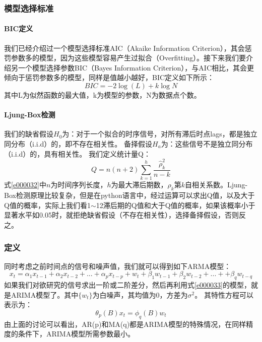 \subsubsection{模型选择标准}
\paragraph{BIC定义}
我们已经介绍过一个模型选择标准AIC（Akaike Information Criterion），其会惩罚参数多的模型，因为这些模型容易产生过拟合（Overfitting）。接下来我们要介绍另一个模型选择参数BIC（Bayes Information Criterion），与AIC相比，其会更倾向于惩罚参数多的模型，同样是值越小越好，BIC定义如下所示：
\begin{equation}
BIC=-2\log (L) + k \log N
\label{e000031}
\end{equation}
其中L为似然函数的最大值，k为模型的参数，N为数据点个数。
\paragraph{Ljung-Box检测}
我们的缺省假设$H_{0}$为：对于一个拟合的时序信号，对所有滞后时点lags，都是独立同分布（i.i.d）的，即不存在相关性。\newline
备择假设$H_{a}$为：这些信号不是独立同分布（i.i.d）的，具有相关性。\newline
我们定义统计量Q：
\begin{equation}
Q=n(n+2)\sum_{k=1}^{h} \frac{\hat{\rho}_{k}^{2}}{n-k}
\label{e000032}
\end{equation}
式\ref{e000032}中$n$为时间序列长度，$h$为最大滞后期数，$\rho _{k}$第$k$自相关系数。Ljung-Box检测原理比较复杂，但是在python语言中，经过运算可以求出Q值，以及大于Q值的概率，实际上我们看1$\sim$12滞后期的Q值和大于Q值的概率，如果该概率小于显著水平如0.05时，就拒绝缺省假设（不存在相关性），选择备择假设，否则反之。
\subsubsection{定义}
同时考虑之前时间点的信号和噪声值，我们就可以得到如下ARMA模型：
\begin{equation}
x_{t}=\alpha _{1}x_{t-1} + \alpha _{2}x_{t-2} + ... + \alpha _{p}x_{t-p} + w_{t} + \beta _1w_{t-1} + \beta _2w_{t-2}+...+ + \beta _{q}w_{t-q}
\label{e000033}
\end{equation}
如果我们对欲研究的信号求出一阶或二阶差分，然后再利用式\ref{e000033}的模型，就是ARIMA模型了。其中$\{ w_{t} \}$为白噪声，其均值为0，方差为$\sigma ^{2}$。\newline
其特性方程可以表示为：
\begin{equation}
\theta _{p}(B)x_{t}=\phi _{q}(B)w_{t}
\label{e000034}
\end{equation}
由上面的讨论可以看出，AR(p)和MA(q)都是ARIMA模型的特殊情况，在同样精度的条件下，ARIMA模型所需参数最小。
